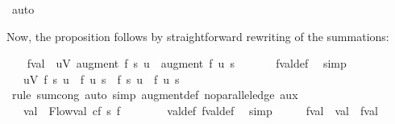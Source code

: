 \begin{isabellebody}
\ auto\isanewline
\ \ \isamarkupfalse%
%
\begin{isamarkuptxt}%
Now, the proposition follows by straightforward rewriting of 
    the summations:%
\end{isamarkuptxt}\isamarkuptrue%
\ \ \isamarkupfalse%
\ {\isachardoublequoteopen}f{\isacharprime}{\isacharprime}{\isachardot}val\ {\isacharequal}\ {\isacharparenleft}{\isasymSum}u{\isasymin}V{\isachardot}\ augment\ f{\isacharprime}\ {\isacharparenleft}s{\isacharcomma}\ u{\isacharparenright}\ {\isacharminus}\ augment\ f{\isacharprime}\ {\isacharparenleft}u{\isacharcomma}\ s{\isacharparenright}{\isacharparenright}{\isachardoublequoteclose}\ \isanewline
\ \ \ \ \isamarkupfalse%
\ f{\isacharprime}{\isacharprime}{\isachardot}val{\isacharunderscore}def\ \isamarkupfalse%
\ simp\isanewline
\ \ \isamarkupfalse%
\ \isamarkupfalse%
\ {\isachardoublequoteopen}{\isasymdots}\ {\isacharequal}\ {\isacharparenleft}{\isasymSum}u{\isasymin}V{\isachardot}\ f\ {\isacharparenleft}s{\isacharcomma}\ u{\isacharparenright}\ {\isacharminus}\ f\ {\isacharparenleft}u{\isacharcomma}\ s{\isacharparenright}\ {\isacharplus}\ {\isacharparenleft}f{\isacharprime}\ {\isacharparenleft}s{\isacharcomma}\ u{\isacharparenright}\ {\isacharminus}\ f{\isacharprime}\ {\isacharparenleft}u{\isacharcomma}\ s{\isacharparenright}{\isacharparenright}{\isacharparenright}{\isachardoublequoteclose}\isanewline
\ \ \ \ %
\isanewline
\ \ \ \ \isamarkupfalse%
\ {\isacharparenleft}rule\ sum{\isachardot}cong{\isacharparenright}\ {\isacharparenleft}auto\ simp{\isacharcolon}\ augment{\isacharunderscore}def\ no{\isacharunderscore}parallel{\isacharunderscore}edge\ aux{}{\isacharparenright}\isanewline
\ \ \isamarkupfalse%
\ \isamarkupfalse%
\ {\isachardoublequoteopen}{\isasymdots}\ {\isacharequal}\ val\ {\isacharplus}\ Flow{\isachardot}val\ cf\ s\ f{\isacharprime}{\isachardoublequoteclose}\ \ \isanewline
\ \ \ \ \isamarkupfalse%
\ val{\isacharunderscore}def\ f{\isacharprime}{\isachardot}val{\isacharunderscore}def\ \isamarkupfalse%
\ simp\isanewline
\ \ \isamarkupfalse%
\ \isamarkupfalse%
\ {\isachardoublequoteopen}f{\isacharprime}{\isacharprime}{\isachardot}val\ {\isacharequal}\ val\ {\isacharplus}\ f{\isacharprime}{\isachardot}val{\isachardoublequoteclose}\ \isacommand{{\isachardot}}\isamarkupfalse%

\end{isabellebody}
